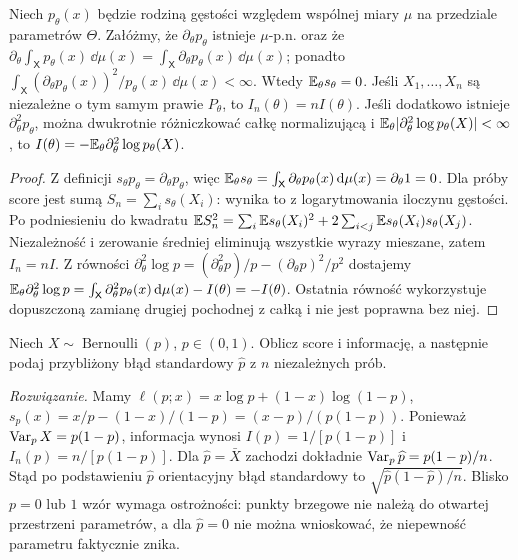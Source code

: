 \begin{twierdzenie}
\label{thm:score-information}
Niech $p_\theta(x)$ będzie rodziną gęstości względem wspólnej
miary $\mu$ na przedziale parametrów $\Theta$. Załóżmy, że
$\partial_\theta p_\theta$ istnieje $\mu$-p.n. oraz że
$\partial_\theta\int_{\mathsf X} p_\theta(x)\,\dd\mu(x)
=\int_{\mathsf X}\partial_\theta p_\theta(x)\,\dd\mu(x)$; ponadto
$\int_{\mathsf X}(\partial_\theta p_\theta(x))^2/p_\theta(x)\,\dd\mu(x)<\infty$.
Wtedy $\mathbb E_\theta s_\theta=0$. Jeśli $X_1,\ldots,X_n$ są
niezależne o tym samym prawie $P_\theta$, to
$I_n(\theta)=nI(\theta)$.
Jeśli dodatkowo istnieje $\partial_\theta^2p_\theta$,
można dwukrotnie różniczkować całkę normalizującą i
$\mathbb E_\theta|\partial_\theta^2\log p_\theta(X)|<\infty$,
to $I(\theta)=-\mathbb E_\theta\partial_\theta^2\log p_\theta(X)$.
\end{twierdzenie}
\begin{proof}
Z definicji $s_\theta p_\theta=\partial_\theta p_\theta$,
więc $\mathbb E_\theta s_\theta=\int_{\mathsf X}\partial_\theta p_\theta(x)
\,\mathrm d\mu(x)=\partial_\theta1=0$. Dla próby score jest sumą
$S_n=\sum_i s_\theta(X_i)$: wynika to z logarytmowania
iloczynu gęstości. Po podniesieniu do kwadratu
$\mathbb E S_n^2=\sum_i\mathbb E s_\theta(X_i)^2+
2\sum_{i<j}\mathbb E s_\theta(X_i)s_\theta(X_j)$.
Niezależność i zerowanie średniej eliminują wszystkie wyrazy
mieszane, zatem $I_n=nI$.
Z równości $\partial_\theta^2\log p=(\partial_\theta^2p)/p-
(\partial_\theta p)^2/p^2$ dostajemy
$\mathbb E_\theta\partial_\theta^2\log p=
\int_{\mathsf X}\partial_\theta^2p_\theta(x)\,\mathrm d\mu(x)-I(\theta)=-I(\theta)$.
Ostatnia równość wykorzystuje dopuszczoną zamianę drugiej
pochodnej z całką i nie jest poprawna bez niej.
\end{proof}

\begin{zadanie}
Niech $X\sim\operatorname{Bernoulli}(p)$, $p\in(0,1)$.
Oblicz score i informację, a następnie podaj przybliżony
błąd standardowy $\widehat p$ z $n$ niezależnych prób.
\par\emph{Rozwiązanie.} Mamy
$\ell(p;x)=x\log p+(1-x)\log(1-p)$,
$s_p(x)=x/p-(1-x)/(1-p)=(x-p)/(p(1-p))$.
Ponieważ $\operatorname{Var}_p X=p(1-p)$, informacja wynosi
$I(p)=1/[p(1-p)]$ i $I_n(p)=n/[p(1-p)]$.
Dla $\widehat p=\bar X$ zachodzi dokładnie
$\operatorname{Var}_p\widehat p=p(1-p)/n$. Stąd po podstawieniu
$\widehat p$ orientacyjny błąd standardowy to
$\sqrt{\widehat p(1-\widehat p)/n}$.
Blisko $p=0$ lub $1$ wzór wymaga ostrożności: punkty brzegowe
nie należą do otwartej przestrzeni parametrów, a dla $\widehat p=0$
nie można wnioskować, że niepewność parametru faktycznie znika.
\end{zadanie}

